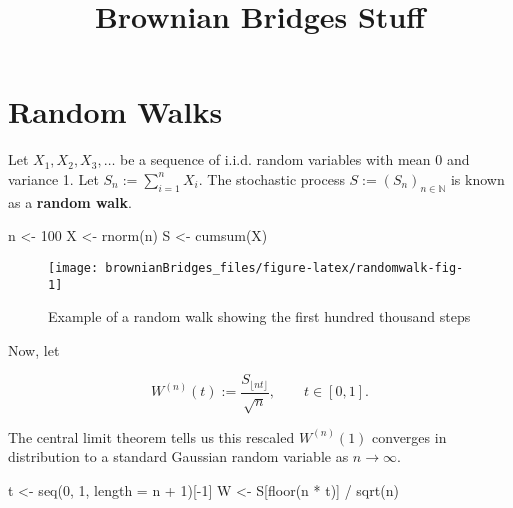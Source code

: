 \documentclass[
]{article}
\title{Brownian Bridges Stuff}
\author{}
\date{\vspace{-2.5em}}
\newenvironment{Shaded}{\begin{snugshade}}{\end{snugshade}}
\newcommand{\AttributeTok}[1]{\textcolor[rgb]{0.77,0.63,0.00}{#1}}
\newcommand{\DecValTok}[1]{\textcolor[rgb]{0.00,0.00,0.81}{#1}}
\newcommand{\FunctionTok}[1]{\textcolor[rgb]{0.00,0.00,0.00}{#1}}
\newcommand{\NormalTok}[1]{#1}
\newcommand{\OtherTok}[1]{\textcolor[rgb]{0.56,0.35,0.01}{#1}}
\newcommand{\SpecialCharTok}[1]{\textcolor[rgb]{0.00,0.00,0.00}{#1}}
\begin{document}
\maketitle

{
\setcounter{tocdepth}{2}
\tableofcontents
}
\hypertarget{random-walks}{%
\section{Random Walks}\label{random-walks}}

Let \(X_1, X_2, X_3, \dots\) be a sequence of i.i.d. random variables with mean 0 and variance 1. Let \(S_n := \sum_{i=1}^n X_i\). The stochastic process \(S := (S_n)_{n \in \mathbb{N}}\) is known as a \textbf{random walk}.

\begin{Shaded}
\begin{Highlighting}[]
\NormalTok{n }\OtherTok{\textless{}{-}} \DecValTok{100}
\NormalTok{X }\OtherTok{\textless{}{-}} \FunctionTok{rnorm}\NormalTok{(n)}
\NormalTok{S }\OtherTok{\textless{}{-}} \FunctionTok{cumsum}\NormalTok{(X)}
\end{Highlighting}
\end{Shaded}

\begin{figure}
\texttt{[image: brownianBridges\_files/figure-latex/randomwalk-fig-1]} \caption{Example of a random walk showing the first hundred thousand steps}\label{fig:randomwalk-fig}
\end{figure}

Now, let

\[
  W^{(n)}(t) := \frac{S_{\lfloor nt \rfloor}}{\sqrt{n}}, \qquad t \in [0, 1].
\]

The central limit theorem tells us this rescaled \(W^{(n)}(1)\) converges in distribution to a standard Gaussian random variable as \(n \to \infty\).

\begin{Shaded}
\begin{Highlighting}[]
\NormalTok{t }\OtherTok{\textless{}{-}} \FunctionTok{seq}\NormalTok{(}\DecValTok{0}\NormalTok{, }\DecValTok{1}\NormalTok{, }\AttributeTok{length =}\NormalTok{ n }\SpecialCharTok{+} \DecValTok{1}\NormalTok{)[}\SpecialCharTok{{-}}\DecValTok{1}\NormalTok{]}
\NormalTok{W }\OtherTok{\textless{}{-}}\NormalTok{ S[}\FunctionTok{floor}\NormalTok{(n }\SpecialCharTok{*}\NormalTok{ t)] }\SpecialCharTok{/} \FunctionTok{sqrt}\NormalTok{(n)}
\end{Highlighting}
\end{Shaded}
\end{document}
